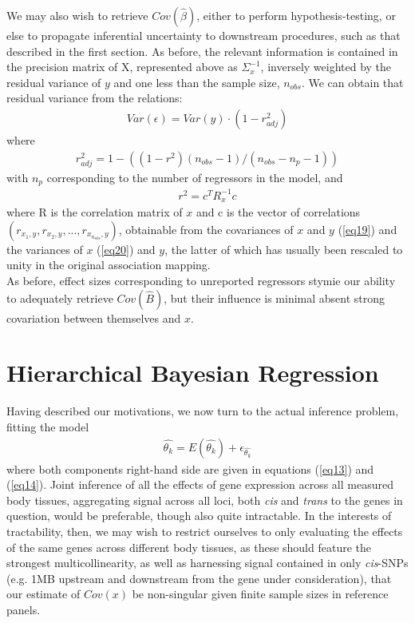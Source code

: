 \documentclass[12pt]{article}
\begin{document}
We may also wish to retrieve $Cov(\hat{\beta})$, either to perform hypothesis-testing, or else to propagate inferential uncertainty to downstream procedures, such as that described in the first section. As before, the relevant information is contained in the precision matrix of X, represented above as $\Sigma_x^{-1}$, inversely weighted by the residual variance of $y$ and one less than the sample size, $n_{obs}$. We can obtain that residual variance from the relations:
\begin{align}
Var(\epsilon) = Var(y) \cdot (1-r^2_{adj}) \label{eq28}
\end{align}
where
\begin{align}
r^2_{adj} = 1-((1- r^2) (n_{obs}-1) / (n_{obs}-n_p-1)) \label{eq29}
\end{align}
with $n_p$ corresponding to the number of regressors in the model, and
\begin{align}
r^2 = c^{T}R_x^{-1}c \label{eq30}
\end{align}
where R is the correlation matrix of $x$ and c is the vector of correlations $(r_{x_1,y}, r_{x_2,y}, ..., r_{x_{n_{obs}},y})$, obtainable from the covariances of $x$ and $y$ (\ref{eq19}) and the variances of $x$ (\ref{eq20}) and $y$, the latter of which has usually been rescaled to unity in the original association mapping.\\

As before, effect sizes corresponding to unreported regressors stymie our ability to adequately retrieve $Cov(\hat{B})$, but their influence is minimal absent strong covariation between themselves and $x$.

\section{Hierarchical Bayesian Regression}\label{sectionBayes}

Having described our motivations, we now turn to the actual inference problem, fitting the model
\begin{align}
\hat{\theta_{k}} = E(\hat{\theta_{k}}) + \epsilon_{\hat{\theta_{k}}} \label{eq31}
\end{align}
where both components right-hand side are given in equations (\ref{eq13}) and (\ref{eq14}). Joint inference of all the effects of gene expression across all measured body tissues, aggregating signal across all loci, both \textit{cis} and \textit{trans} to the genes in question, would be preferable, though also quite intractable. In the interests of tractability, then, we may wish to restrict ourselves to only evaluating the effects of the same genes across different body tissues, as these should feature the strongest multicollinearity, as well as harnessing signal contained in only \textit{cis}-SNPs (e.g. 1MB upstream and downstream from the gene under consideration), that our estimate of $Cov(x)$ be non-singular given finite sample sizes in reference panels.\\
\end{document}
